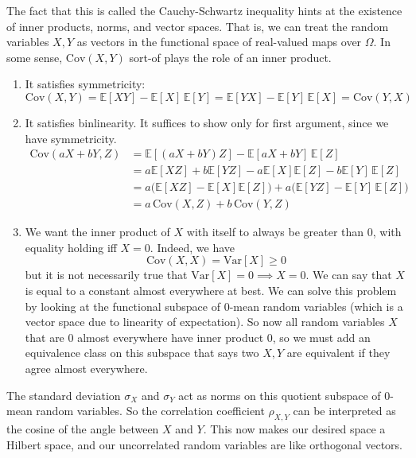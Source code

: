 \documentclass{article}
\theoremstyle{definition}
\theoremstyle{remark}
\theoremstyle{definition}
\begin{document}
The fact that this is called the Cauchy-Schwartz inequality hints at the existence of inner products, norms, and vector spaces. That is, we can treat the random variables $X, Y$ as vectors in the functional space of real-valued maps over $\Omega$. In some sense, $\mathrm{Cov}(X, Y)$ sort-of plays the role of an inner product. 
\begin{enumerate}
    \item It satisfies symmetricity: 
    \[\mathrm{Cov}(X, Y) = \mathbb{E}[X Y] - \mathbb{E}[X] \, \mathbb{E}[Y] =  \mathbb{E}[Y X] - \mathbb{E}[Y] \, \mathbb{E}[X] = \mathrm{Cov}(Y, X)\] 
    
    \item It satisfies binlinearity. It suffices to show only for first argument, since we have symmetricity. 
    \begin{align*}
        \mathrm{Cov}(aX + bY, Z) & = \mathbb{E}[(a X + b Y) Z] - \mathbb{E}[a X + b Y] \, \mathbb{E}[Z] \\
        & = a \mathbb{E}[X Z] + b \mathbb{E}[Y Z] - a \mathbb{E}[X] \mathbb{E}[Z] - b \mathbb{E}[Y] \, \mathbb{E}[Z] \\
        & = a \big( \mathbb{E}[X Z] - \mathbb{E}[X] \mathbb{E}[Z] \big) + a \big( \mathbb{E}[Y Z] - \mathbb{E}[Y] \, \mathbb{E}[Z] \big) \\
        & = a \, \mathrm{Cov}(X, Z) + b \, \mathrm{Cov}(Y, Z)
    \end{align*}

    \item We want the inner product of $X$ with itself to always be greater than $0$, with equality holding iff $X = 0$. Indeed, we have 
    \[\mathrm{Cov}(X, X) = \mathrm{Var}[X] \geq 0\]
    but it is not necessarily true that $\mathrm{Var}[X] = 0 \implies X = 0$. We can say that $X$ is equal to a constant almost everywhere at best. We can solve this problem by looking at the functional subspace of $0$-mean random variables (which is a vector space due to linearity of expectation). So now all random variables $X$ that are $0$ almost everywhere have inner product $0$, so we must add an equivalence class on this subspace that says two $X, Y$ are equivalent if they agree almost everywhere. 
\end{enumerate}
The standard deviation $\sigma_X$ and $\sigma_Y$ act as norms on this quotient subspace of $0$-mean random variables. So the correlation coefficient $\rho_{X, Y}$ can be interpreted as the cosine of the angle between $X$ and $Y$. This now makes our desired space a Hilbert space, and our uncorrelated random variables are like orthogonal vectors. 
\end{document}
